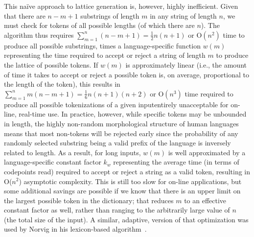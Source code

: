 This na\"ive approach to lattice generation is, however, highly inefficient. Given that there are $n-m+1$ substrings of length $m$ in any string of length $n$, we must check for tokens of all possible lengths (of which there are $n$). The algorithm thus requires $\sum_{m=1}^{n}(n-m+1)=\frac{1}{2}n(n+1)$ or O$(n^{2})$ time to produce all possible substrings, times a language-specific function $w(m)$ representing the time required to accept or reject a string of length $m$ to produce the lattice of possible tokens. If $w(m)$ is approximately linear (i.e., the amount of time it takes to accept or reject a possible token is, on average, proportional to the length of the token), this results in $\sum_{m=1}^{n}m(n-m+1)=\frac{1}{6}n(n+1)(n+2)$ or O$(n^{3})$ time required to produce all possible tokenizations of a given input\textemdash entirely unacceptable for on-line, real-time use.
In practice, however, while specific tokens may be unbounded in length, the highly non-random morphological structure of human languages means that most non-tokens will be rejected early since the probability of any randomly selected substring being a valid prefix of the language is inversely related to length. As a result, for long inputs, $w(m)$ is well approximated by a language-specific constant factor $k_w$ representing the average time (in terms of codepoints read) required to accept or reject a string as a valid token, resulting in O($n^{2}$) asymptotic complexity. This is still too slow for on-line applications, but some additional savings are possible if we know that there is an upper limit on the largest possible token in the dictionary; that reduces $m$ to an effective constant factor as well, rather than ranging to the arbitrarily large value of $n$ (the total size of the input). A similar, adaptive, version of that optimization was used by Norvig in his lexicon-based algorithm~\cite{norvig14}.

